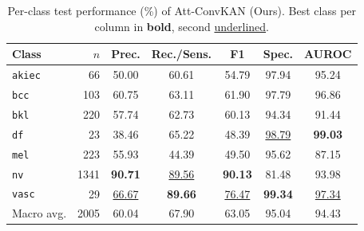 \begin{table}[!t]
\centering
\caption{Per-class test performance (\%) of Att-ConvKAN (Ours). Best class per column in \textbf{bold}, second \underline{underlined}.}
\label{tab:perclass}
\setlength{\tabcolsep}{3.5pt}
\begin{tabular}{l r ccccc}
\toprule
Class & $n$ & Prec. & Rec./Sens. & F1 & Spec. & AUROC \\
\midrule
\texttt{akiec} & 66 & 50.00 & 60.61 & 54.79 & 97.94 & 95.24 \\
\texttt{bcc} & 103 & 60.75 & 63.11 & 61.90 & 97.79 & 96.86 \\
\texttt{bkl} & 220 & 57.74 & 62.73 & 60.13 & 94.34 & 91.44 \\
\texttt{df} & 23 & 38.46 & 65.22 & 48.39 & \underline{98.79} & \textbf{99.03} \\
\texttt{mel} & 223 & 55.93 & 44.39 & 49.50 & 95.62 & 87.15 \\
\texttt{nv} & 1341 & \textbf{90.71} & \underline{89.56} & \textbf{90.13} & 81.48 & 93.98 \\
\texttt{vasc} & 29 & \underline{66.67} & \textbf{89.66} & \underline{76.47} & \textbf{99.34} & \underline{97.34} \\
\midrule
Macro avg. & 2005 & 60.04 & 67.90 & 63.05 & 95.04 & 94.43 \\
\bottomrule
\end{tabular}
\end{table}

